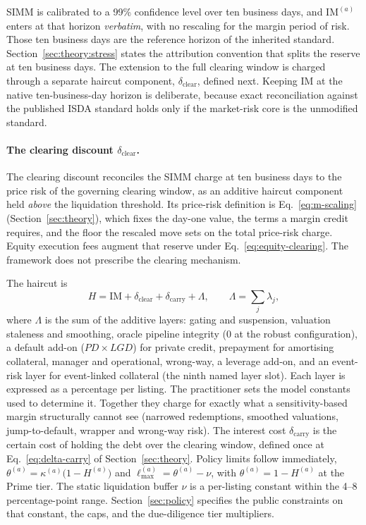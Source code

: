 SIMM is calibrated to a 99\% confidence level over ten business days, and $\mathrm{IM}^{(a)}$ enters at that
horizon \emph{verbatim}, with no rescaling for the margin period of risk. Those ten business days
are the reference horizon of the inherited standard. Section~\ref{sec:theory:stress} states the
attribution convention that splits the reserve at ten business days. The extension to the full
clearing window is charged through a separate haircut component,
$\delta_{\mathrm{clear}}$, defined next. Keeping $\mathrm{IM}$ at the native ten-business-day
horizon is deliberate, because exact reconciliation against the published ISDA standard
holds only if the market-risk core is the unmodified standard.

\paragraph{The clearing discount $\delta_{\mathrm{clear}}$.} The clearing discount reconciles the SIMM charge at ten business days to the price risk of the governing clearing window, as an additive haircut component held \emph{above} the liquidation threshold. Its price-risk definition is Eq.~\eqref{eq:m-scaling} (Section~\ref{sec:theory}), which fixes the day-one value, the terms a margin credit requires, and the floor the rescaled move sets on the total price-risk charge. Equity execution fees augment that reserve under Eq.~\eqref{eq:equity-clearing}. The framework does not prescribe the clearing mechanism.

The haircut is
\begin{equation}\label{eq:agg-haircut}
H=\mathrm{IM}+\delta_{\mathrm{clear}}+\delta_{\mathrm{carry}}+\Lambda,\qquad
\Lambda=\sum_j \lambda_j ,
\end{equation}
where $\Lambda$ is the sum of the additive layers: gating and suspension, valuation
staleness and smoothing, oracle pipeline integrity ($0$ at the robust configuration), a default
add-on ($PD\times LGD$) for private credit, prepayment for amortising collateral, manager and
operational, wrong-way, a leverage add-on, and an event-risk layer for event-linked collateral
(the ninth named layer slot). Each layer is expressed as a percentage per listing. The
practitioner sets the model constants used to determine it. Together
they charge for exactly what a sensitivity-based margin structurally
cannot see (narrowed redemptions, smoothed valuations, jump-to-default, wrapper and wrong-way
risk). The interest cost $\delta_{\mathrm{carry}}$ is the certain cost of holding the debt over
the clearing window, defined once at Eq.~\eqref{eq:delta-carry} of Section~\ref{sec:theory}.
Policy limits follow immediately, $\theta^{(a)}=\kappa^{(a)}\bigl(1-H^{(a)}\bigr)$ and
$\ell_{\max}^{(a)}=\theta^{(a)}-\nu$, with $\theta^{(a)}=1-H^{(a)}$ at the Prime tier. The
static liquidation buffer $\nu$ is a per-listing constant within the 4--8 percentage-point
range. Section~\ref{sec:policy} specifies the public constraints on that constant, the caps,
and the due-diligence tier multipliers.

